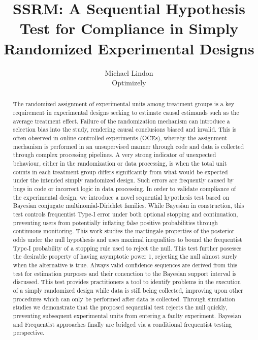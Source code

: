 \documentclass[11pt]{article}
\begin{document}
\vspace{-1in}
\title{SSRM: A Sequential Hypothesis Test for Compliance in Simply Randomized Experimental Designs}
\author{\Large Michael Lindon \\ Optimizely}
\maketitle 
\begin{abstract}
  The randomized assignment of experimental units among treatment groups is a key requirement in experimental designs seeking to estimate causal estimands such as the average treatment effect. Failure of the randomization mechanism can introduce a selection bias into the study, rendering causal conclusions biased and invalid. This is often observed in online controlled experiments (OCEs), whereby the assignment mechanism is performed in an unsupervised manner through code and data is collected through complex processing pipelines. A very strong indicator of unexpected behaviour, either in the randomization or data processing, is when the total unit counts in each treatment group differs significantly from what would be expected under the intended simply randomized design. Such errors are frequently caused by bugs in code or incorrect logic in data processing. In order to validate compliance of the experimental design, we introduce a novel sequential hypothesis test based on Bayesian conjugate multinomial-Dirichlet families. While Bayesian in construction, this test controls frequentist Type-I error under both optional stopping and continuation, preventing users from potentially inflating false positive probabilities through continuous monitoring. This work studies the martingale properties of the posterior odds under the null hypothesis and uses maximal inequalities to bound the frequentist Type-I probability of a stopping rule used to reject the null. This test further posesses the desirable property of having asymptotic power 1, rejecting the null almost surely when the alternative is true. Always valid confidence sequences are derived from this test for estimation purposes and their conenction to the Bayesian support interval is discussed. This test provides practitioners a tool to identify problems in the execution of a simply randomized design while data is still being collected, improving upon other procedures which can only be performed after data is collected. Through simulation studies we demonstrate that the proposed sequential test rejects the null quickly, preventing subsequent experimental units from entering a faulty experiment. Bayesian and Frequentist approaches finally are bridged via a conditional frequentist testing perspective. 
\end{abstract}
\end{document}
